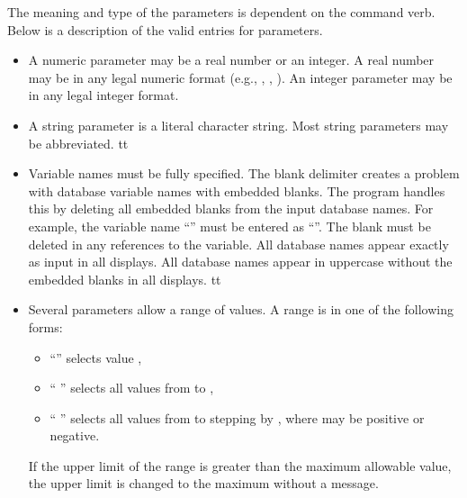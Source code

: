 The meaning and type of the parameters is dependent on the command verb.
Below is a description of the valid entries for parameters. 
\setlength{\itemsep}{\medskipamount} \begin{itemize}
%
\item
A numeric parameter may be a real number or an integer. A real number
may be in any legal  numeric format (e.g., ,
, ). An integer parameter may be in any legal
integer format.
\item
A string parameter is a literal character string. Most string parameters
may be abbreviated.
%
\newcommand{\okname}{f}
\ifx\PROGRAM\BLOT \renewcommand{\okname}{t} \fi
\ifx\PROGRAM\ALGEBRA \renewcommand{\okname}{t} \fi
\ifx\PROGRAM\GROPE \renewcommand{\okname}{t} \fi
\if\okname t
\item
Variable names must be fully specified. The blank delimiter creates a
problem with database variable names with embedded blanks. The program
handles this by deleting all embedded blanks from the input database
names. For example, the variable name ``'' must be entered as
``''. The blank must be deleted in any references to the
variable.
\ifx\PROGRAM\GROPE
All database names appear exactly as input in all displays.
\else
All database names appear in uppercase without the embedded blanks in
all displays.
\fi
\fi
\newcommand{\okrange}{f}
\ifx\PROGRAM\BLOT \renewcommand{\okrange}{t} \fi
\ifx\PROGRAM\GROPE \renewcommand{\okrange}{t} \fi
\ifx\PROGRAM\NUMBERS \renewcommand{\okrange}{t} \fi
\if\okrange t
\item
Several parameters allow a range of values. A range is in one of the
following forms:
\setlength{\itemsep}{\medskipamount} \begin{itemize}
\item ``'' selects value ,
\item ``  '' selects all values from
 to ,
\item ``    ''
selects all values from  to  stepping by
, where  may be positive or negative.
\end{itemize}
If the upper limit of the range is greater than the maximum allowable
value, the upper limit is changed to the maximum without a message.
\fi
\end{itemize}

